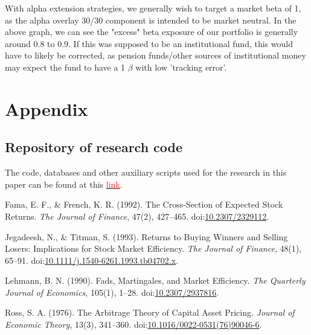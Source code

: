 \documentclass[12pt]{article}
\begin{document}
With alpha extension strategies, we generally wish to target a market beta of 1, as the alpha overlay 30/30
component is intended to be market neutral. In the above graph, we can see the "excess" beta exposure 
of our portfolio is generally around 0.8 to 0.9. If this was supposed to be an institutional fund,
this would have to likely be corrected, as pension funds/other sources of institutional money may 
expect the fund to have a 1 $\beta$ with low 'tracking error'.
\pagebreak
\section{Appendix}
\subsection{Repository of research code}

The code, databases and other auxiliary scripts used for the research in this paper can be found at this \href{https://github.com/haezera/quant-strats-in-us-equities}{\textcolor{red}{link}}.

\pagebreak
\begin{thebibliography}{}

Fama, E. F., \& French, K. R. (1992).  
The Cross-Section of Expected Stock Returns.  
\textit{The Journal of Finance}, 47(2), 427–465.  
doi:\href{https://doi.org/10.2307/2329112}{10.2307/2329112}.

Jegadeesh, N., \& Titman, S. (1993).  
Returns to Buying Winners and Selling Losers: Implications for Stock Market Efficiency.  
\textit{The Journal of Finance}, 48(1), 65–91.  
doi:\href{https://doi.org/10.1111/j.1540-6261.1993.tb04702.x}{10.1111/j.1540-6261.1993.tb04702.x}.

Lehmann, B. N. (1990).  
Fads, Martingales, and Market Efficiency.  
\textit{The Quarterly Journal of Economics}, 105(1), 1–28.  
doi:\href{https://doi.org/10.2307/2937816}{10.2307/2937816}.

Ross, S. A. (1976).  
The Arbitrage Theory of Capital Asset Pricing.  
\textit{Journal of Economic Theory}, 13(3), 341–360.  
doi:\href{https://doi.org/10.1016/0022-0531(76)90046-6}{10.1016/0022-0531(76)90046-6}.

\end{thebibliography}
\end{document}
